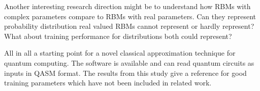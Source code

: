 Another interesting research direction might be 
to understand how RBMs with complex parameters compare to RBMs with real parameters. Can they 
represent probability distribution real valued RBMs cannot represent or hardly represent? What 
about training performance for distributions both could represent?

All in all a starting point for a novel classical approximation technique for quantum computing.
The software is available and can read quantum circuits as inputs in QASM format. The results from 
this study give a reference for good training parameters which have not been included in related work.


